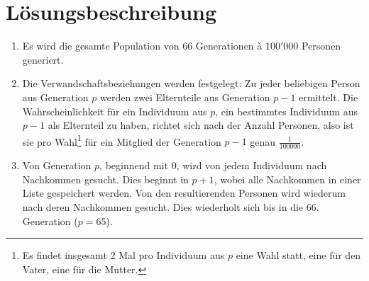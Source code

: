 \documentclass[a4paper,10pt,headlines=3.2]{scrartcl}
\begin{document}
\section{Lösungsbeschreibung}
\begin{enumerate}
\item Es wird die gesamte Population von $66$ Generationen à $100'000$ Personen generiert.
\item Die Verwandschaftsbeziehungen werden festgelegt: Zu jeder beliebigen Person aus Generation $p$ werden zwei Elternteile aus Generation $p-1$ ermittelt. Die Wahrscheinlichkeit für ein Individuum aus $p$, ein bestimmtes Individuum aus $p-1$ als Elternteil zu haben, richtet sich nach der Anzahl Personen, also ist sie pro Wahl\footnote{Es findet insgesamt 2 Mal pro Individuum aus $p$ eine Wahl statt, eine für den Vater, eine für die Mutter.} für ein Mitglied der Generation $p-1$ genau $\frac{1}{100000}$.
\item Von Generation $p$, beginnend mit $0$, wird von jedem Individuum nach Nachkommen gesucht. Dies beginnt in $p+1$, wobei alle Nachkommen in einer Liste gespeichert werden. Von den resultierenden Personen wird wiederum nach deren Nachkommen gesucht. Dies wiederholt sich bis in die 66. Generation ($p = 65$).
\end{enumerate}
\end{document}

